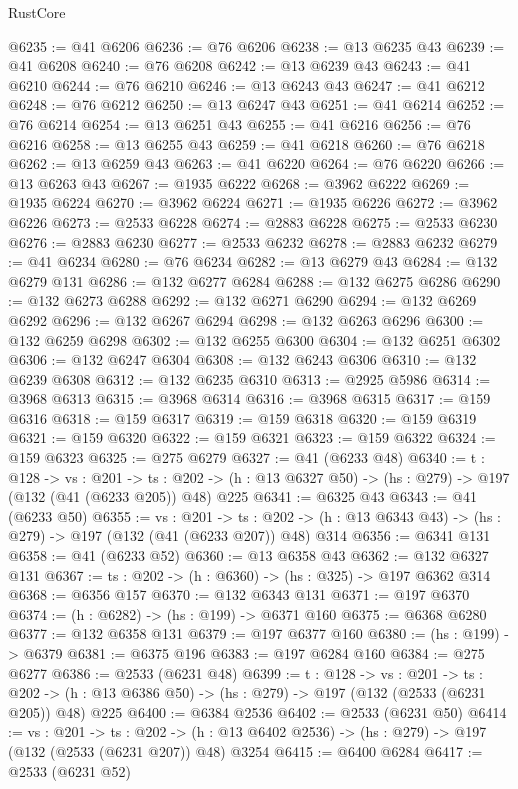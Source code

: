 \begin{lexlean}{RustCore}
\begin{coremodule}
@6235 := @41 @6206
@6236 := @76 @6206
@6238 := @13 @6235 @43
@6239 := @41 @6208
@6240 := @76 @6208
@6242 := @13 @6239 @43
@6243 := @41 @6210
@6244 := @76 @6210
@6246 := @13 @6243 @43
@6247 := @41 @6212
@6248 := @76 @6212
@6250 := @13 @6247 @43
@6251 := @41 @6214
@6252 := @76 @6214
@6254 := @13 @6251 @43
@6255 := @41 @6216
@6256 := @76 @6216
@6258 := @13 @6255 @43
@6259 := @41 @6218
@6260 := @76 @6218
@6262 := @13 @6259 @43
@6263 := @41 @6220
@6264 := @76 @6220
@6266 := @13 @6263 @43
@6267 := @1935 @6222
@6268 := @3962 @6222
@6269 := @1935 @6224
@6270 := @3962 @6224
@6271 := @1935 @6226
@6272 := @3962 @6226
@6273 := @2533 @6228
@6274 := @2883 @6228
@6275 := @2533 @6230
@6276 := @2883 @6230
@6277 := @2533 @6232
@6278 := @2883 @6232
@6279 := @41 @6234
@6280 := @76 @6234
@6282 := @13 @6279 @43
@6284 := @132 @6279 @131
@6286 := @132 @6277 @6284
@6288 := @132 @6275 @6286
@6290 := @132 @6273 @6288
@6292 := @132 @6271 @6290
@6294 := @132 @6269 @6292
@6296 := @132 @6267 @6294
@6298 := @132 @6263 @6296
@6300 := @132 @6259 @6298
@6302 := @132 @6255 @6300
@6304 := @132 @6251 @6302
@6306 := @132 @6247 @6304
@6308 := @132 @6243 @6306
@6310 := @132 @6239 @6308
@6312 := @132 @6235 @6310
@6313 := @2925 @5986
@6314 := @3968 @6313
@6315 := @3968 @6314
@6316 := @3968 @6315
@6317 := @159 @6316
@6318 := @159 @6317
@6319 := @159 @6318
@6320 := @159 @6319
@6321 := @159 @6320
@6322 := @159 @6321
@6323 := @159 @6322
@6324 := @159 @6323
@6325 := @275 @6279
@6327 := @41 (@6233 @48)
@6340 := {t : @128} ->
  {vs : @201} ->
  {ts : @202} -> (h : @13 @6327 @50) -> (hs : @279) -> @197 (@132 (@41 (@6233 @205)) @48) @225
@6341 := @6325 @43
@6343 := @41 (@6233 @50)
@6355 := {vs : @201} ->
  {ts : @202} -> (h : @13 @6343 @43) -> (hs : @279) -> @197 (@132 (@41 (@6233 @207)) @48) @314
@6356 := @6341 @131
@6358 := @41 (@6233 @52)
@6360 := @13 @6358 @43
@6362 := @132 @6327 @131
@6367 := {ts : @202} -> (h : @6360) -> (hs : @325) -> @197 @6362 @314
@6368 := @6356 @157
@6370 := @132 @6343 @131
@6371 := @197 @6370
@6374 := (h : @6282) -> (hs : @199) -> @6371 @160
@6375 := @6368 @6280
@6377 := @132 @6358 @131
@6379 := @197 @6377 @160
@6380 := (hs : @199) -> @6379
@6381 := @6375 @196
@6383 := @197 @6284 @160
@6384 := @275 @6277
@6386 := @2533 (@6231 @48)
@6399 := {t : @128} ->
  {vs : @201} ->
  {ts : @202} -> (h : @13 @6386 @50) -> (hs : @279) -> @197 (@132 (@2533 (@6231 @205)) @48) @225
@6400 := @6384 @2536
@6402 := @2533 (@6231 @50)
@6414 := {vs : @201} ->
  {ts : @202} -> (h : @13 @6402 @2536) -> (hs : @279) -> @197 (@132 (@2533 (@6231 @207)) @48) @3254
@6415 := @6400 @6284
@6417 := @2533 (@6231 @52)

\end{coremodule}
\end{lexlean}
